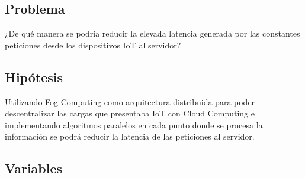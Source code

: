     \subsection{Problema}
        ¿De qué manera se podría reducir la elevada latencia generada por las constantes peticiones desde los dispositivos IoT al servidor?\par
    \subsection{Hipótesis}
        Utilizando Fog Computing como arquitectura distribuida para poder descentralizar las cargas que presentaba IoT con Cloud Computing e implementando algoritmos paralelos en cada punto donde se procesa la información se podrá reducir la latencia de las peticiones al servidor.\par

\newpage

    \subsection{Variables}
